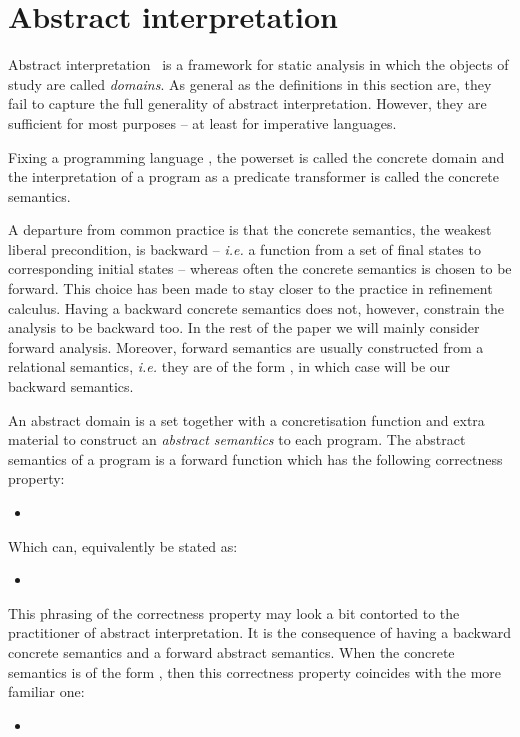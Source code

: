 \documentclass[]{llncs}
\begin{document}
  \section{Abstract interpretation}\label{latex_lib_label_2}
\par
Abstract interpretation~\cite{Cousot1992} is a framework for static analysis in which the objects of study are called \emph{domains}. As general as the definitions in this section are, they fail to capture the full generality of abstract interpretation. However, they are sufficient for most purposes -- at least for imperative languages.
\par
Fixing a programming language , the powerset  is called the concrete domain and the interpretation of a program as a predicate transformer  is called the concrete semantics.
\par
A departure from common practice is that the concrete semantics, the weakest liberal precondition, is backward -- \emph{i.e.} a function from a set of final states to corresponding initial states -- whereas often the concrete semantics is chosen to be forward. This choice has been made to stay closer to the practice in refinement calculus. Having a backward concrete semantics does not, however, constrain the analysis to be backward too. In the rest of the paper we will mainly consider forward analysis. Moreover, forward semantics are usually constructed from a relational semantics, \emph{i.e.} they are of the form , in which case  will be our backward semantics.
\par
An abstract domain is a set  together with a concretisation function  and extra material to construct an \emph{abstract semantics} to each program. The abstract semantics of a program is a forward function  which has the following correctness property:
  \begin{itemize}
    \item 
  \end{itemize}
  Which can, equivalently be stated as:
  \begin{itemize}
    \item 
  \end{itemize}
  This phrasing of the correctness property may look a bit contorted to the practitioner of abstract interpretation. It is the consequence of having a backward concrete semantics and a forward abstract semantics. When the concrete semantics is of the form , then this correctness property coincides with the more familiar one:
  \begin{itemize}
    \item 
  \end{itemize}
\end{document}
